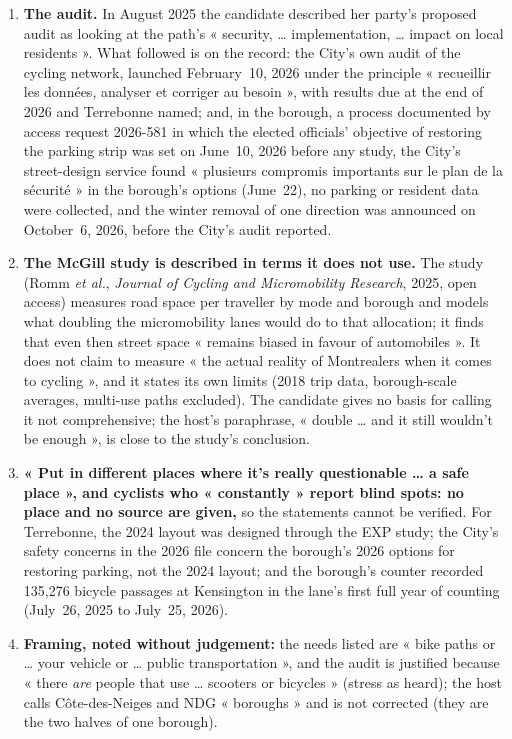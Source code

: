 \documentclass[10pt,letterpaper]{article}
\begin{document}
\begin{enumerate}[nosep,itemsep=0.3em,leftmargin=1.4em]
\item \textbf{The audit.} In August 2025 the candidate described her party's proposed audit as looking at the path's « security, … implementation, … impact on local residents ». What followed is on the record: the City's own audit of the cycling network, launched February~10, 2026 under the principle « recueillir les données, analyser et corriger au besoin », with results due at the end of 2026 and Terrebonne named; and, in the borough, a process documented by access request 2026-581 in which the elected officials' objective of restoring the parking strip was set on June~10, 2026 before any study, the City's street-design service found « plusieurs compromis importants sur le plan de la sécurité » in the borough's options (June~22), no parking or resident data were collected, and the winter removal of one direction was announced on October~6, 2026, before the City's audit reported.
\item \textbf{The McGill study is described in terms it does not use.} The study (Romm \emph{et al.}, \emph{Journal of Cycling and Micromobility Research}, 2025, open access) measures road space per traveller by mode and borough and models what doubling the micromobility lanes would do to that allocation; it finds that even then street space « remains biased in favour of automobiles ». It does not claim to measure « the actual reality of Montrealers when it comes to cycling », and it states its own limits (2018 trip data, borough-scale averages, multi-use paths excluded). The candidate gives no basis for calling it not comprehensive; the host's paraphrase, « double … and it still wouldn't be enough », is close to the study's conclusion.
\item \textbf{« Put in different places where it's really questionable … a safe place », and cyclists who « constantly » report blind spots: no place and no source are given,} so the statements cannot be verified. For Terrebonne, the 2024 layout was designed through the EXP study; the City's safety concerns in the 2026 file concern the borough's 2026 options for restoring parking, not the 2024 layout; and the borough's counter recorded 135,276 bicycle passages at Kensington in the lane's first full year of counting (July~26, 2025 to July~25, 2026).
\item \textbf{Framing, noted without judgement:} the needs listed are « bike paths or … your vehicle or … public transportation », and the audit is justified because « there \emph{are} people that use … scooters or bicycles » (stress as heard); the host calls Côte-des-Neiges and NDG « boroughs » and is not corrected (they are the two halves of one borough).
\end{enumerate}
\end{document}

